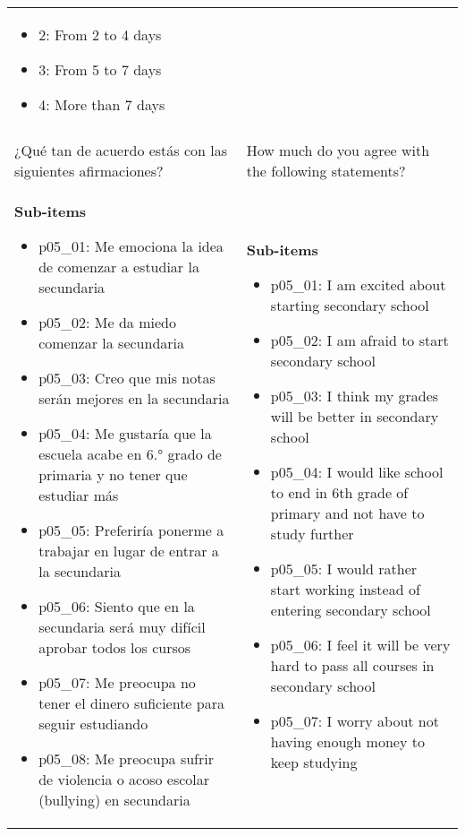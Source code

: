 \documentclass[11pt]{article}
\begin{document}
\begin{longtable}{@{}LL@{}}
\begin{itemize}[leftmargin=*]
\item 2: From 2 to 4 days
\item 3: From 5 to 7 days
\item 4: More than 7 days\end{itemize} \\
\addlinespace[4pt]
 \\ 
¿Qué tan de acuerdo estás con las siguientes afirmaciones? & How much do you agree with the following statements? \\
\textbf{Sub-items}\par\begin{itemize}[leftmargin=*]\item p05\_01: Me emociona la idea de comenzar a estudiar la secundaria
\item p05\_02: Me da miedo comenzar la secundaria
\item p05\_03: Creo que mis notas serán mejores en la secundaria
\item p05\_04: Me gustaría que la escuela acabe en 6.° grado de primaria y no tener que estudiar más
\item p05\_05: Preferiría ponerme a trabajar en lugar de entrar a la secundaria
\item p05\_06: Siento que en la secundaria será muy difícil aprobar todos los cursos
\item p05\_07: Me preocupa no tener el dinero suficiente para seguir estudiando
\item p05\_08: Me preocupa sufrir de violencia o acoso escolar (bullying) en secundaria\end{itemize} & \textbf{Sub-items}\par\begin{itemize}[leftmargin=*]\item p05\_01: I am excited about starting secondary school
\item p05\_02: I am afraid to start secondary school
\item p05\_03: I think my grades will be better in secondary school
\item p05\_04: I would like school to end in 6th grade of primary and not have to study further
\item p05\_05: I would rather start working instead of entering secondary school
\item p05\_06: I feel it will be very hard to pass all courses in secondary school
\item p05\_07: I worry about not having enough money to keep studying

\end{itemize}
\end{longtable}
\end{document}
